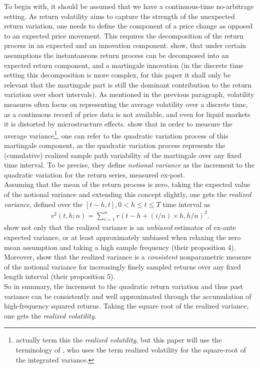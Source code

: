 To begin with, it should be assumed that we have a continuous-time no-arbitrage setting. As return volatility aims to capture the strength of the unexpected return variation, one needs to define the component of a price change as opposed to an expected price movement. This requires the decomposition of the return process in an expected and an innovation component. \citeauthor{andersen2001} show, that under certain assumptions the instantaneous return process can be decomposed into an expected return component, and a martingale innovation (in the discrete time setting this decomposition is more complex, for this paper it shall only be relevant that the martingale part is still the dominant contribution to the return variation over short intervals). As mentioned in the previous paragraph, volatility measures often focus on representing the average volatility over a discrete time, as a continuous record of price data is not available, and even for liquid markets it is distorted by microstructure effects. \textcite{andersen2001} show that in order to measure the average variance\footnote{actually \textcite{andersen2001} term this the \emph{realized volatility}, but this paper will use the terminology of \textcite{corsi2009}, who uses the term realized volatility for the square-root of the integrated variance.}, one can refer to the quadratic variation process of this martingale component, as the quadratic variation process represents the (cumulative) realized sample path variability of the martingale over any fixed time interval. To be precise, they define \emph{notional variance} as the increment to the quadratic variation for the return series, measured ex-post. \\
Assuming that the mean of the return process is zero, taking the expected value of the notional variance and extending this concept slightly, one gets the \emph{realized variance}, defined over the $[t-h,t], 0 < h \leq t \leq T$ time interval as
\begin{align}\label{eq:RV-andersen}
v^2(t,h;n) = \sum_{i=1}^{n} r(t-h+(i/n) \times h,h/n)^2.
\end{align}
\citeauthor{andersen2001} show not only that the realized variance is an \emph{unbiased} estimator of ex-ante expected variance, or at least approximately unbiased when relaxing the zero mean assumption and taking a high sample frequency (their proposition 4). Moreover, \citeauthor{andersen2001} show that the realized variance is a \emph{consistent} nonparametric measure of the notional variance for increasingly finely sampled returns over any fixed length interval (their proposition 5).\\
So in summary, the increment to the quadratic return variation and thus past variance can be consistently and well approximated through the accumulation of high-frequency squared returns. Taking the square root of the realized variance, one gets the \emph{realized volatility}.\\ 



